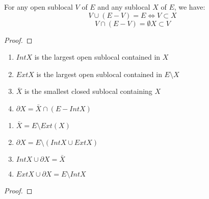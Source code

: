 \begin{lemma}
    \label{lem:properties_of_complements_part_2}
    \leanok
    For any open sublocal $V$ of $E$ and any sublocal $X$ of $E$, we have:
    \[V \cup (E - V) = E \iff V \subset X \]
    \[V \cap (E - V) = \emptyset X \subset V\]
\end{lemma}
\begin{proof}
    \leanok
\end{proof}



\begin{comment}
\begin{lemma}[(1.11) Distribution of Intersections over Unions]
    \label{lem:distribution_of_intersections_over_unions}
    \uses{lem:open_closed_intersection}
    Let $X, Y, L$ be three sub locals of $E$. If $L$ is open or closed, we have:
    \[L \cap (X \cap Y) = (L \cap X) \cup (L \cap Y)\]
\end{lemma}
\end{comment}
\begin{definition}
    \label{def:further_topology}
    \leanok
    \begin{enumerate}
        \item $Int X$ is the largest open sublocal contained in $X$
        \item $Ext X$ is the largest open sublocal contained in $E \setminus X$
        \item $\bar{X}$ is the smallest closed sublocal containing $X$
        \item $\partial X = \bar{X} \cap (E - Int X)$
    \end{enumerate}
\end{definition}

\begin{lemma} 
    \label{lem:properties_of_further_topology}
    \leanok
    \begin{enumerate}
        \item $\bar{X} = E \setminus Ext(X)$
        \item $\partial X = E \setminus (Int X \cup Ext X)$
        \item $Int X \cup \partial X = \bar X$
        \item $Ext X \cup \partial X = E \setminus Int X$
    \end{enumerate}
\end{lemma}

\begin{proof}
    \leanok
\end{proof}


